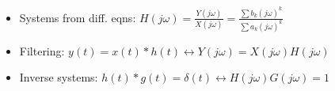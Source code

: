 \documentclass[10pt, twocolumn]{article}
\begin{document}
\begin{itemize}
\begin{itemize}
        \item Rectangular pulse $\leftrightarrow$ sinc function
        \item Sinc function $\leftrightarrow$ rectangular pulse
        \item $e^{-at}u(t), \text{Re}\{a\}>0 \leftrightarrow \frac{1}{a+j\omega}$
        \end{itemize}
    \item Systems from diff. eqns: $H(j\omega) = \frac{Y(j\omega)}{X(j\omega)} = \frac{\sum b_k (j\omega)^k}{\sum a_k (j\omega)^k}$
    \item Filtering: $y(t) = x(t)*h(t) \leftrightarrow Y(j\omega)=X(j\omega)H(j\omega)$
    \item Inverse systems: $h(t)*g(t)=\delta(t) \leftrightarrow H(j\omega)G(j\omega)=1$
\end{itemize}

\end{document}

